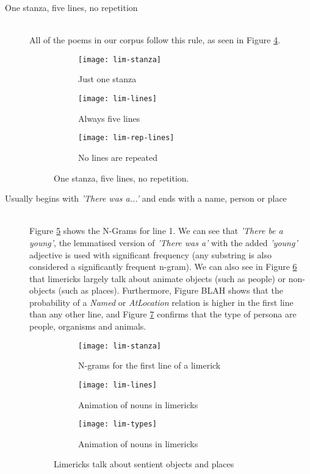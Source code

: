\begin{description}
\item[One stanza, five lines, no repetition]  \hfill \\
All of the poems in our corpus follow this rule, as seen in Figure \ref{fig:lim1}.
\begin{figure}[H]
\centering
\begin{subfigure}[t]{0.3\textwidth}
	\centering
    \texttt{[image: lim-stanza]}
    \caption{Just one stanza}
    \label{fig:lim-stanza}
\end{subfigure}
\begin{subfigure}[t]{0.3\textwidth}
	\centering
    \texttt{[image: lim-lines]}
    \caption{Always five lines}
    \label{fig:lim-lines}
\end{subfigure}
\begin{subfigure}[t]{0.3\textwidth}
	\centering
    \texttt{[image: lim-rep-lines]}
    \caption{No lines are repeated}
    \label{fig:lim-rep-lines}
\end{subfigure}
\caption{One stanza, five lines, no repetition.}
\label{fig:lim1}
\end{figure}


\item[Usually begins with \textit{'There was a...'} and ends with a name, person or place]  \hfill \\
Figure \ref{fig:lim-grams1} shows the N-Grams for line 1. We can see that \textit{'There be a young'}, the lemmatised version of \textit{'There was a'} with the added \textit{'young'} adjective is used with significant frequency (any substring is also considered a significantly frequent n-gram). We can also see in Figure \ref{fig:lim-anim} that limericks largely talk about animate objects (such as people) or non-objects (such as places). Furthermore, Figure BLAH shows that the probability of a \textit{Named} or \textit{AtLocation} relation is higher in the first line than any other line, and Figure \ref{fig:lim-types} confirms that the type of persona are people, organisms and animals.

\begin{figure}[H]
\centering
\begin{subfigure}[t]{0.9\textwidth}
	\centering
    \texttt{[image: lim-stanza]}
    \caption{N-grams for the first line of a limerick}
    \label{fig:lim-grams1}
\end{subfigure}
\begin{subfigure}[t]{0.9\textwidth}
	\centering
    \texttt{[image: lim-lines]}
    \caption{Animation of nouns in limericks}
    \label{fig:lim-anim}
\end{subfigure}
\begin{subfigure}[t]{0.9\textwidth}
	\centering
    \texttt{[image: lim-types]}
    \caption{Animation of nouns in limericks}
    \label{fig:lim-types}
\end{subfigure}
\caption{Limericks talk about sentient objects and places}
\label{fig:lim2}
\end{figure}


\end{description}

